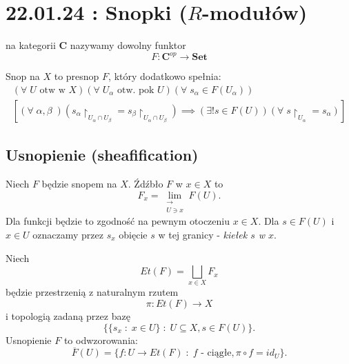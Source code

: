 \section{22.01.24 : Snopki ($R$-modułów)}

   na kategorii $\mathbf{C}$ nazywamy dowolny funktor
  $$F:\mathbf{C}^{op}\to\mathbf{Set}$$

Snop na $X$ to presnop $F$, który dodatkowo spełnia:
\begin{align*}
  (\forall\;U\text{ otw w }X)(\forall\;U_\alpha\text{ otw. pok }U)(\forall\;s_\alpha\in F(U_\alpha))\\ 
  [(\forall\;\alpha,\beta\;)(s_\alpha\restriction_{U_\alpha\cap U_\beta}=s_\beta\restriction_{U_\alpha\cap U_\beta})\implies (\exists! s\in F(U))(\forall\;s\restriction_{U_\alpha}=s_\alpha)]
\end{align*}

\subsection{Usnopienie (sheafification)}
Niech $F$ będzie snopem na $X$. Źdźbło $F$ w $x\in X$ to 
$$F_x=\lim\limits_{\substack{\longrightarrow\\ U\ni x}}F(U).$$ Dla funkcji będzie to zgodność na pewnym otoczeniu $x\in X$. Dla $s\in F(U)$ i $x\in U$ oznaczamy przez $s_x$ obięcie $s$ w tej granicy - \emph{kiełek $s$ w $x$}.

Niech 
$$Et(F)=\bigsqcup_{x\in X} F_x$$ 
będzie przestrzenią z naturalnym rzutem 
$$\pi:Et(F)\to X$$ 
i topologią zadaną przez bazę 
$$\{\{s_x\;:\;x\in U\}\;:\;U\subseteq X, s\in F(U)\}.$$
Usnopienie $F$ to odwzorowania:
$$\overline{F}(U)=\{f:U\to Et(F)\;:\;f\text{ - ciągłe}, \pi\circ f=id_U\}.$$

\begin{center}
\end{center}


